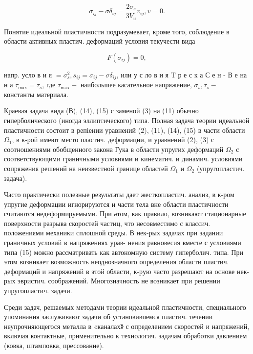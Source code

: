 \documentclass[10pt]{article}
\begin{document}
\[

\sigma_{i j}-\sigma \delta_{i j}=\frac{2 \sigma_{s}}{3 V_{u}} v_{i j}, v=0 .

\]



Понятие идеальной пластичности подразумевает, кроме того, соблюдение в области активных пластич. деформаций условия текучести вида



\[

F\left(\sigma_{i j}\right)=0,

\]



напр. усло в и я $=\sigma_{s}^{2}, s_{i j}=\sigma_{i j}-\sigma \delta_{i j}$, или у с ло в и я $\mathrm{T}$ р е с к а С е н - В е на н а $\tau_{\max }=\tau_{s}$, где $\tau_{\max }-$ наибольшее касательное напряжение, $\sigma_{s}, \tau_{s}-$ константы материала.



Краевая задача вида (В), (14), (15) с заменой (3) на (11) обычно гиперболического (иногда эллиптического) типа. Полная задача теории идеальной пластичности состоит в репіении уравнений (2), (11), (14), (15) в части области $\Omega_{1}$, в к-рой имеют место пластич. деформации, и уравнений (2), (3) с соотношениями обобщенного закона Гука в области упругих деформаций $\Omega_{2}$ с соответствующими граничными условиями и кинематич. и динамич. условиями сопряжения решений на неизвестной границе областей $\Omega_{1}$ и $\Omega_{2}$ (упругопластич. задача).



Часто практически полезные результаты дает жесткопластич. анализ, в к-ром упругие деформации игнорируются и части тела вне области пластичности считаются недеформируемыми. При әтом, как правило, возникают стационарные поверхности разрыва скоростей частиц, что несовместимо с классич. положениями механики сплошной среды. В нек-рых задачах при задании граничных условий в напряжениях урав- нения равновесия вместе с условиями типа (15) можно рассматривать как автономную систему гиперболич. типа. При этом возникает возможность неоднозначного определения области пластич. деформаций и напряжений в этой области, к-рую часто разрешают на основе нек-рых эвристич. соображений. Многозначность не возникает при решении упругопластич. задачи.



Среди задач, решаемых методами теории идеальной пластичности, специального упоминания заслуживают задачи об установивпемся пластич. течении неупрочняющегося металла в «каналах》 с определением скоростей и напряжений, включая контактные, применительно к технологич. задачам обработки давлением (ковка, штамповка, прессование).
\end{document}
